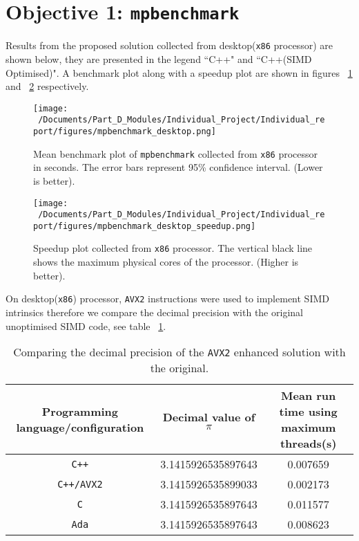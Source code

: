 \section{Objective 1: \texttt{mpbenchmark}}

Results from the proposed solution collected from desktop(\texttt{x86} processor) are shown below, they are presented in the legend ``C++" and ``C++(SIMD Optimised)". A benchmark plot along with a speedup plot are shown in figures ~\ref{fig:mpbenchmark_desktop_plot} and ~\ref{fig:mpbenchmark_desktop_speedup_plot} respectively. 

\begin{figure}[htbp] %
	\centering
	\texttt{[image: ~/Documents/Part\_D\_Modules/Individual\_Project/Individual\_report/figures/mpbenchmark\_desktop.png]} %
	\caption{Mean benchmark plot of \texttt{mpbenchmark} collected from \texttt{x86} processor in seconds. The error bars represent 95\% confidence interval. (Lower is better).}
	\label{fig:mpbenchmark_desktop_plot} %
\end{figure}


\begin{figure}[htbp] %
	\centering
	\texttt{[image: ~/Documents/Part\_D\_Modules/Individual\_Project/Individual\_report/figures/mpbenchmark\_desktop\_speedup.png]} %
	\caption{Speedup plot collected from \texttt{x86} processor. The vertical black line shows the maximum physical cores of the processor. (Higher is better).}
	\label{fig:mpbenchmark_desktop_speedup_plot} %
\end{figure}

On desktop(\texttt{x86}) processor, \texttt{AVX2} instructions were used to implement SIMD intrinsics therefore we compare the decimal precision with the original unoptimised SIMD code, see table ~\ref{tab:c++_avx2_pi}.

\begin{table}[htbp]
	\centering
	\begin{tabular}{|c|c|c|}
		\hline
		\textbf{Programming language/configuration} & \textbf{Decimal value of $\pi$} & \textbf{Mean run time using maximum threads(s)} \\ \hline
		\texttt{C++}             & 3.1415926535897643 &  0.007659 \\ \hline
		\texttt{C++/AVX2}   & 3.1415926535899033 &  0.002173  \\ \hline
		\texttt{C}                 & 3.1415926535897643 & 0.011577 \\ \hline
		\texttt{Ada}             & 3.1415926535897643 &  0.008623\\ \hline
	\end{tabular}
	\label{tab:c++_avx2_pi}
	\caption{Comparing the decimal precision of the \texttt{AVX2} enhanced solution with the original.}
\end{table}

